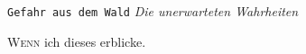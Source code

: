 \texttt{\Huge Gefahr aus dem Wald}
\newline
\textit{\Large Die unerwarteten Wahrheiten}
\normalsize
\begin{adjmulticols*}{3}{0pt}{0in}
  \lettrine{W}{enn} ich dieses erblicke. \lipsum[1-2]
\end{adjmulticols*}
